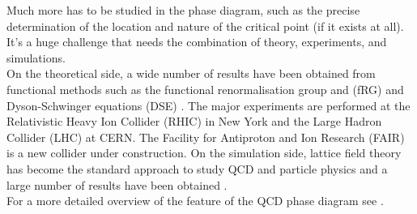 Much more has to be studied in the phase diagram, such as the precise determination of the location and nature of the critical point (if it exists at all). It's a huge challenge that needs the combination of theory, experiments, and simulations. \\
On the theoretical side, a wide number of results have been obtained from functional methods such as the functional renormalisation group and (fRG) and Dyson-Schwinger equations (DSE) \cite{QCDphase,QCDphase2,Gao_2021}.
The major experiments are performed at the Relativistic Heavy Ion Collider (RHIC) in New York and the Large Hadron
Collider (LHC) at CERN. The Facility for Antiproton and Ion Research (FAIR) is a new collider under construction. On the simulation side, lattice field theory has become the standard approach to study QCD and particle physics and a large number of results have been obtained \cite{wuppertal,201915,Endroedi_2014}. \\
For a more detailed overview of the feature of the QCD phase diagram see \cite{phasediag1,Bellwied2015}.
